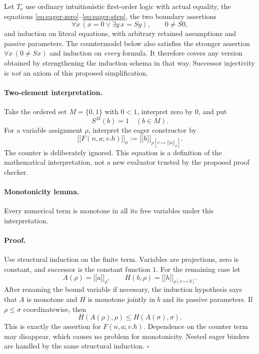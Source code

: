\documentclass[11pt,letterpaper]{article}
\theoremstyle{definition}\newtheorem{definition}[theorem]{Definition}
\theoremstyle{remark}\newtheorem{remark}[theorem]{Remark}
\newcommand{\llbracket}{\mathopen{[\![}}
\newcommand{\rrbracket}{\mathclose{]\!]}}
\begin{document}
Let $T_{\mathrm e}$ use ordinary intuitionistic first-order logic with
actual equality, the equations \eqref{eq:eager-zero}--\eqref{eq:eager-step},
the two boundary assertions
\[
 \forall x\,(x=0\vee\exists y\,x=Sy),\qquad 0\ne S0,
\]
and induction on literal equations, with arbitrary retained assumptions
and passive parameters.  The countermodel below also satisfies the
stronger assertion $\forall x\,(0\ne Sx)$ and induction on \emph{every}
formula.  It therefore covers any version obtained by strengthening the
induction schema in that way.  Successor injectivity is \emph{not} an
axiom of this proposed simplification.

\paragraph{Two-element interpretation.}
Take the ordered set $M=\{0,1\}$ with $0<1$, interpret zero by $0$, and put
\[
                         S^M(b)=1\quad(b\in M).
\]
For a variable assignment $\rho$, interpret the eager constructor by
\[
 \llbracket F(n,a;v.h)\rrbracket_\rho
   :=\llbracket h\rrbracket_{\rho[v\mapsto\llbracket a\rrbracket_\rho]}.
 \tag{Eager interpretation}
\]
The counter is deliberately ignored.  This equation is a definition of
the mathematical interpretation, not a new evaluator trusted by the
proposed proof checker.

\paragraph{Monotonicity lemma.}
Every numerical term is monotone in all its free variables under this
interpretation.

\paragraph{Proof.}
Use structural induction on the finite term.  Variables are projections,
zero is constant, and successor is the constant function $1$.  For the
remaining case let
\[
 A(\rho)=\llbracket a\rrbracket_\rho,
 \qquad H(b,\rho)=\llbracket h\rrbracket_{\rho[v\mapsto b]}.
\]
After renaming the bound variable if necessary, the induction hypothesis
says that $A$ is monotone and $H$ is monotone jointly in $b$ and its passive
parameters.  If $\rho\le\sigma$ coordinatewise, then
\[
 H(A(\rho),\rho)\le H(A(\sigma),\sigma).
\]
This is exactly the assertion for $F(n,a;v.h)$.  Dependence on the
counter term may disappear, which causes no problem for monotonicity.
Nested eager binders are handled by the same structural induction.
\hfill$\square$
\end{document}
